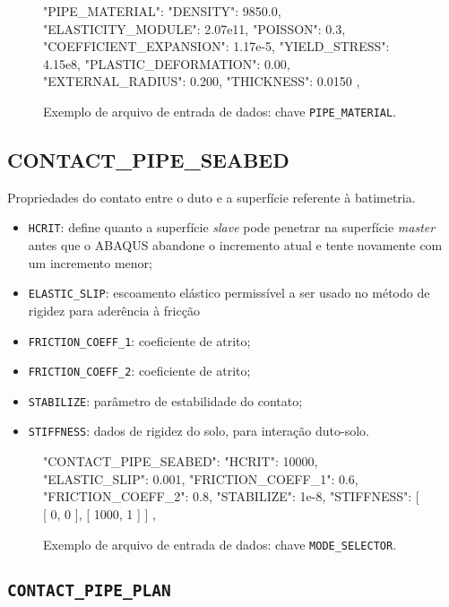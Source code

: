 \begin{figure}
\caption{Exemplo de arquivo de entrada de dados: chave \texttt{PIPE\_MATERIAL}.\label{lst:pipe_material}}
\begin{jsoncode}
{
  "PIPE_MATERIAL": {
    "DENSITY": 9850.0,
    "ELASTICITY_MODULE": 2.07e11,
    "POISSON": 0.3,
    "COEFFICIENT_EXPANSION": 1.17e-5,
    "YIELD_STRESS": 4.15e8,
    "PLASTIC_DEFORMATION": 0.00,
    "EXTERNAL_RADIUS": 0.200,
    "THICKNESS": 0.0150
  },
}
\end{jsoncode}
\end{figure}


\subsection{CONTACT\_PIPE\_SEABED}


Propriedades do contato entre o duto e a superfície referente à batimetria.

\begin{itemize}
  \item \texttt{HCRIT}: define quanto a superfície \textit{slave} pode penetrar na superfície \textit{master} antes que o ABAQUS abandone o incremento atual e tente novamente com um incremento menor;
  \item \texttt{ELASTIC\_SLIP}: escoamento elástico permissível a ser usado no método de rigidez para aderência à fricção
  \item \texttt{FRICTION\_COEFF\_1}: coeficiente de atrito;
  \item \texttt{FRICTION\_COEFF\_2}: coeficiente de atrito;
  \item \texttt{STABILIZE}: parâmetro de estabilidade do contato;
  \item \texttt{STIFFNESS}: dados de rigidez do solo, para interação duto-solo.
\end{itemize}

\begin{figure}
\caption{Exemplo de arquivo de entrada de dados: chave \texttt{MODE\_SELECTOR}.\label{lst:mode_selector}}
\begin{jsoncode}
{
  "CONTACT_PIPE_SEABED": {
    "HCRIT": 10000,
    "ELASTIC_SLIP": 0.001,
    "FRICTION_COEFF_1": 0.6,
    "FRICTION_COEFF_2": 0.8,
    "STABILIZE": 1e-8,
    "STIFFNESS": [
      [
        0,
        0
      ],
      [
        1000,
        1
      ]
    ]
  },
}
\end{jsoncode}
\end{figure}


\subsection{\texttt{CONTACT\_PIPE\_PLAN}}

